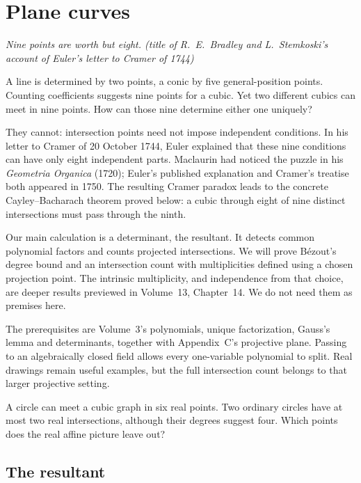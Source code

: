 \chapter{Plane curves}\label{geometry:ch:curves}

\begin{center}\itshape
Nine points are worth but eight.
\upshape(title of R.~E.~Bradley and L.~Stemkoski's account of Euler's letter to Cramer of 1744)
\end{center}

A line is determined by two points, a conic by five general-position points. Counting coefficients suggests nine points for a cubic. Yet two different cubics can meet in nine points. How can those nine determine either one uniquely?

They cannot: intersection points need not impose independent conditions. In his letter to Cramer of 20 October 1744, Euler explained that these nine conditions can have only eight independent parts. Maclaurin had noticed the puzzle in his \emph{Geometria Organica} (1720); Euler's published explanation and Cramer's treatise both appeared in 1750. The resulting Cramer paradox leads to the concrete Cayley--Bacharach theorem proved below: a cubic through eight of nine distinct intersections must pass through the ninth.

Our main calculation is a determinant, the resultant. It detects common polynomial factors and counts projected intersections. We will prove B\'ezout's degree bound and an intersection count with multiplicities defined using a chosen projection point. The intrinsic multiplicity, and independence from that choice, are deeper results previewed in Volume~13, Chapter~14. We do not need them as premises here.

The prerequisites are Volume~3's polynomials, unique factorization, Gauss's lemma and determinants, together with Appendix~C's projective plane. Passing to an algebraically closed field allows every one-variable polynomial to split. Real drawings remain useful examples, but the full intersection count belongs to that larger projective setting.

\begin{think}
A circle can meet a cubic graph in six real points. Two ordinary circles have at most two real intersections, although their degrees suggest four. Which points does the real affine picture leave out?
\end{think}

\section{The resultant}


